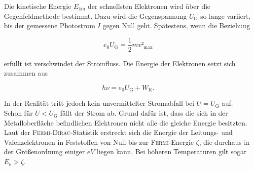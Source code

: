 Die kinetische Energie $E_\mathup{kin}$ der schnellsten Elektronen wird über die Gegenfeldmethode bestimmt. 
Dazu wird die Gegenspannung $U_\mathup{G}$ so lange variiert, bis der gemessene Photostrom $I$ gegen Null geht. 
Spätestens, wenn die Beziehung

\begin{equation}
	e_0 U_\mathup{G}=\frac{1}{2}mv²_\mathup{max}
\end{equation}

erfüllt ist verschwindet der Stromfluss.
Die Energie der Elektronen setzt sich zusammen aus

\begin{equation}
	h\nu=e_0 U_\mathup{G}+W_\mathup{K}.
\end{equation}

In der Realität tritt jedoch kein unvermittelter Stromabfall bei $U = U_\mathup{G}$ auf. 
Schon für $U< U_\mathup{G}$ fällt der Strom ab.
 Grund dafür ist, dass die sich in der Metalloberfläche befindlichen Elektronen nicht alle die gleiche Energie besitzten. 
Laut der \textsc{Fermi}-\textsc{Dirac}-Statistik erstreckt sich die Energie der Leitungs- und Valenzelektronen in Feststoffen von Null bis zur \textsc{Fermi}-Energie $\zeta$, die durchaus in der Größenordnung einiger $eV$ liegen kann.
Bei höheren Temperaturen gilt sogar $E_\mathup{e}>\zeta$. 

